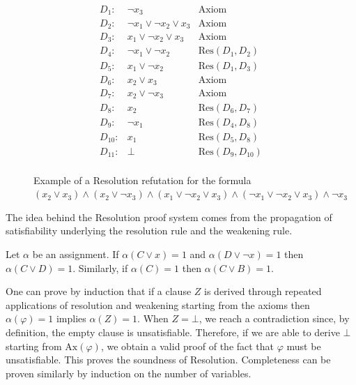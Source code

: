 \begin{figure}
    \[\begin{array}{rcl}
        D_1 :& \lnot{x_3} & \text{Axiom} \\
        D_2 :& \lnot{x_1} \lor \lnot{x_2} \lor x_3 & \text{Axiom} \\
        D_3 :& x_1 \lor \lnot{x_2} \lor x_3 & \text{Axiom} \\
        D_4 :& \lnot{x_1} \lor \lnot{x_2} & \mathrm{Res}(D_1, D_2) \\
        D_5 :& x_1 \lor \lnot{x_2} & \mathrm{Res}(D_1, D_3) \\
        D_6 :& x_2 \lor x_3 & \text{Axiom} \\
        D_7 :& x_2 \lor \lnot{x_3} & \text{Axiom} \\
        D_8 :& x_2 & \mathrm{Res}(D_6,D_7) \\
        D_9 :& \lnot{x_1} & \mathrm{Res}(D_4, D_8) \\
        D_{10} :& x_1 & \mathrm{Res}(D_5, D_8) \\
        D_{11} :& \bot & \mathrm{Res}(D_9, D_{10}) \\
    \end{array}\]
    \caption{Example of a Resolution refutation for the formula $(x_2 \lor x_3) \land (x_2 \lor \lnot{x_3}) \land (x_1 \lor \lnot{x_2} \lor x_3) \land (\lnot{x_1} \lor \lnot{x_2} \lor x_3) \land \lnot{x_3}$}
    \label{fig:res_example_1}
\end{figure}

The idea behind the Resolution proof system comes from the propagation of satisfiability underlying the resolution rule and the weakening rule.

\begin{proposition}
    Let $\alpha$ be an assignment. If $\alpha(C \lor x) = 1$ and $\alpha(D \lor \lnot x) = 1$ then $\alpha(C \lor D) = 1$. Similarly, if $\alpha(C) = 1$ then $\alpha(C \lor B) = 1$.
\end{proposition}

One can prove by induction that if a clause $Z$ is derived through repeated applications of resolution and weakening starting from the axioms then $\alpha(\varphi) = 1$ implies $\alpha(Z) = 1$. When $Z = \bot$, we reach a contradiction since, by definition, the empty clause is unsatisfiable. Therefore, if we are able to derive $\bot$ starting from $\mathrm{Ax}(\varphi)$, we obtain a valid proof of the fact that $\varphi$ must be unsatisfiable. This proves the soundness of Resolution. Completeness can be proven similarly by induction on the number of variables.

